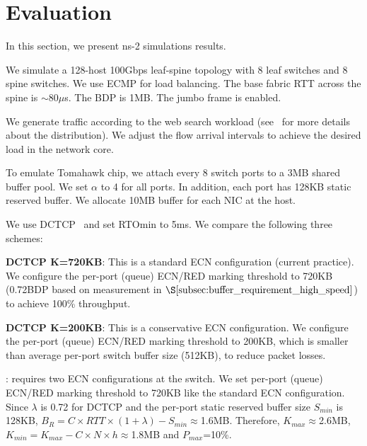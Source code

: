 \section{Evaluation}\label{sec:evaluation}
In this section, we present ns-2 simulations results.

\vspace{-1mm}
We simulate a 128-host 100Gbps leaf-spine topology with 8 leaf switches and 8 spine switches. We use ECMP for load balancing. The base fabric RTT across the spine is $\sim$80$\mu$s. The BDP is 1MB. The jumbo frame is enabled.

\vspace{-1mm}
We generate traffic according to the web search workload (see~\cite{dctcp} for more details about the distribution). We adjust the flow arrival intervals to achieve the desired load in the network core. 

\vspace{-1mm}
To emulate Tomahawk chip, we attach every 8 switch ports to a 3MB shared buffer pool. We set $\alpha$ to 4 for all ports. In addition, each port has 128KB static reserved buffer. We allocate 10MB buffer for each NIC at the host.

\vspace{-1mm}
We use DCTCP~\cite{dctcp} and set RTOmin to 5ms. We compare the following three schemes:
\begin{icompact}
\item \textbf{DCTCP K=720KB}: This is a standard ECN configuration (current practice). We configure the per-port (queue) ECN/RED marking threshold to 720KB (0.72BDP based on measurement in $\S\ref{subsec:buffer_requirement_high_speed}$) to achieve 100\% throughput.
\vspace{-1mm}
\item \textbf{DCTCP K=200KB}: This is a conservative ECN configuration. We configure the per-port (queue) ECN/RED marking threshold to 200KB, which is smaller than average per-port switch buffer size (512KB), to reduce packet losses.
\vspace{-1mm}
\item \textbf{\sys}: \sys requires two ECN configurations at the switch. We set per-port (queue) ECN/RED marking threshold to 720KB like the standard ECN configuration. Since $\lambda$ is 0.72 for DCTCP and the per-port static reserved buffer size $S_{min}$ is 128KB, $B_R=C\times RTT\times(1+\lambda)-S_{min}\approx$1.6MB. Therefore, $K_{max}\approx$2.6MB, $K_{min}=K_{max}-C\times N\times h\approx$1.8MB and $P_{max}$=10\%.
\end{icompact}

